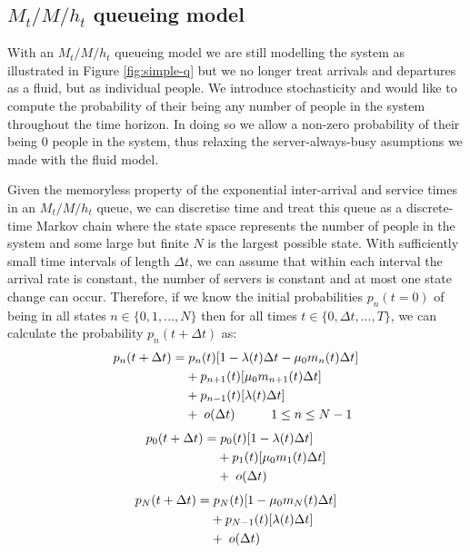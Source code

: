 \documentclass{article}
\begin{document}
\subsection{$M_t/M/h_t$ queueing model}
With an $M_t/M/h_t$ queueing model we are still modelling the system as illustrated in Figure \ref{fig:simple-q} but we no longer treat arrivals and departures as a fluid, but as individual people. We introduce stochasticity and would like to compute the probability of their being any number of people in the system throughout the time horizon. In doing so we allow a non-zero probability of their being $0$ people in the system, thus relaxing the server-always-busy asumptions we made with the fluid model.

Given the memoryless property of the exponential inter-arrival and service times in an $M_t/M/h_t$ queue, we can discretise time and treat this queue as a discrete-time Markov chain where the state space represents the number of people in the system and some large but finite $N$ is the largest possible state. With sufficiently small time intervals of length $\Delta t$, we can assume that within each interval the arrival rate is constant, the number of servers is constant and at most one state change can occur. Therefore, if we know the initial probabilities $p_n(t=0)$ of being in all states $n \in \{0,1,...,N\}$ then for all times $t \in \{0, \Delta t,...,T\}$, we can calculate the probability $p_n(t + \Delta t)$ as: 
% 
\begin{align*}
  p_n(t+\Delta t) = & \hspace{0.1cm} p_{n}(t)[1-\lambda(t)\Delta t-\mu_0 m_n(t) \Delta t] \\
                    & + p_{n+1}(t)[\mu_0 m_{n+1}(t) \Delta t] \\
                    & + p_{n-1}(t)[\lambda(t) \Delta t] \\
                    & + \hspace{0.1cm} o(\Delta t) \hspace{1cm} 1 \leq n \leq N-1
\end{align*}
% 
\begin{align*}
  p_0(t+\Delta t) = & \hspace{0.1cm} p_{0}(t)[1-\lambda(t)\Delta t] \\
                    & + p_{1}(t)[\mu_0 m_{1}(t) \Delta t] \\
                    & + \hspace{0.1cm} o(\Delta t)
\end{align*}
% 
\begin{align*}
  p_N(t+\Delta t) = & \hspace{0.1cm} p_{N}(t)[1-\mu_0 m_N(t) \Delta t] \\
                    & + p_{N-1}(t)[\lambda(t) \Delta t] \\
                    & + \hspace{0.1cm} o(\Delta t)
\end{align*}
\end{document}
